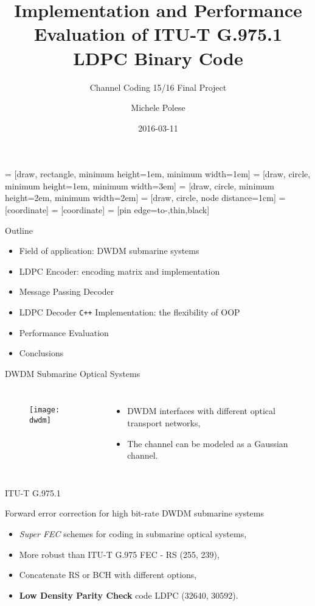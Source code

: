 \documentclass[pdf]
          {beamer}
\title{Implementation and Performance Evaluation of ITU-T G.975.1 LDPC Binary Code}
\subtitle{Channel Coding 15/16 Final Project}
\author{Michele Polese}
\date{2016-03-11}
\begin{document}
 = [draw, rectangle, 
    minimum height=1em, minimum width=1em]
 = [draw, circle, minimum height=1em, minimum width=3em]
 = [draw, circle, minimum height=2em, minimum width=2em]
 = [draw, circle, node distance=1cm]
 = [coordinate]
 = [coordinate]
 = [pin edge={to-,thin,black}]

\begin{frame}
    \titlepage
\end{frame}
\begin{frame}{Outline}
    \begin{itemize}
    	\item Field of application: DWDM submarine systems
 		\item LDPC Encoder: encoding matrix and implementation
 		\item Message Passing Decoder
 		\item LDPC Decoder \texttt{C++} Implementation: the flexibility of OOP
 		\item Performance Evaluation
 		\item Conclusions
	\end{itemize}
\end{frame}

\begin{frame}{DWDM Submarine Optical Systems}
	\begin{columns}
			\begin{figure}
				\centering
				\texttt{[image: dwdm]}
			\end{figure}
			\begin{itemize}
				\item DWDM interfaces with different optical transport networks,
				\item The channel can be modeled as a Gaussian channel.
			\end{itemize}
	\end{columns}
\end{frame}

\begin{frame}{ITU-T G.975.1}
	\begin{center}
	Forward error correction for high bit-rate DWDM submarine systems 
	\end{center}
	\begin{itemize}
		\item \textit{Super FEC} schemes for coding in submarine optical systems,
		\item More robust than ITU-T G.975 FEC - RS (255, 239),
		\item Concatenate RS or BCH with different options,
		\item \textbf{Low Density Parity Check} code LDPC (32640, 30592).
	\end{itemize}
	
\end{frame}
\end{document}
